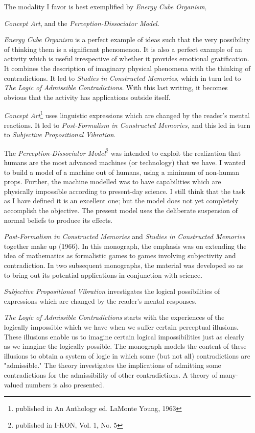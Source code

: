 \documentclass[10pt,twoside]{memoir}
\newcommand{\essaytitle}[1]{
	\emph{#1}}
\begin{document}
The modality I favor is best exemplified by \essaytitle{Energy Cube Organism},
\essaytitle{Concept Art}, and the \essaytitle{Perception-Dissociator Model}. 
\essaytitle{Energy Cube Organism} is a perfect example of ideas such that the very 
possibility of thinking them is a significant phenomenon. It is also a perfect example of an 
activity which is useful irrespective of whether it provides emotional 
gratification. It combines the description of imaginary physical phenomena 
with the thinking of contradictions. It led to \essaytitle{Studies in Constructed 
Memories}, which in turn led to \essaytitle{The Logic of Admissible Contradictions}.
With this last writing, it becomes obvious that the activity has applications 
outside itself. 

\essaytitle{Concept Art}\footnote{published in An Anthology ed. LaMonte Young, 1963}
uses linguistic expressions which are changed by the reader's mental 
reactions. It led to \essaytitle{Post-Formalism in Constructed Memories}, and this led 
in turn to \essaytitle{Subjective Propositional Vibration}.

The \essaytitle{Perception-Dissociator Model}\footnote{published in I-KON, Vol. 1, No. 5} 
was intended to exploit the realization that humans are the most 
advanced machines (or technology) that we have. I wanted to build a model 
of a machine out of humans, using a minimum of non-human props. Further, 
the machine modelled was to have capabilities which are physically 
impossible according to present-day science. I still think that the task as I 
have defined it is an excellent one; but the model does not yet completely 
accomplish the objective. The present model uses the deliberate suspension 
of normal beliefs to produce its effects. 

\essaytitle{Post-Formalism in Constructed Memories} and \essaytitle{Studies in 
Constructed Memories} together make up  (1966). In 
this monograph, the emphasis was on extending the idea of mathematics as 
formalistic games to games involving subjectivity and contradiction. In two 
subsequent monographs, the material was developed so as to bring out its 
potential applications in conjunction with science. 
\essaytitle{Subjective Propositional Vibration} investigates the logical 
possibilities of expressions which are changed by the reader's mental responses.
\essaytitle{The Logic of Admissible Contradictions} starts with the experiences 
of the logically impossible which 
we have when we suffer certain perceptual illusions. These illusions enable us 
to imagine certain logical impossibilities just as clearly as we imagine the 
logically possible. The monograph models the content of these illusions to 
obtain a system of logic in which some (but not all) contradictions are 
"admissible." The theory investigates the implications of admitting some 
contradictions for the admissibility of other contradictions. A theory of 
many-valued numbers is also presented. 
\end{document}
